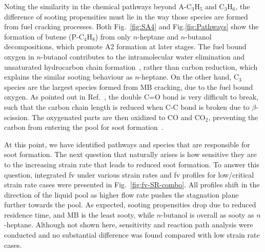 \documentclass[preprint,3p,times,twocolumn]{elsarticleUS}
\begin{document}
Noting the similarity in the chemical pathways beyond A-C$_3$H$_5$ and C$_3$H$_6$, the difference of sooting propensities must lie in the way those species are formed from fuel cracking processes. Both Fig.~\ref{fig:SA4} and Fig.\ref{fig:Pathways} show the formation of butene (P-C$_4$H$_8$) from only $n$-heptane and $n$-butanol decompositions, which promote A2 formation at later stages. The fuel bound oxygen in $n$-butanol contributes to the intramolecular water elimination and unsaturated hydrocarbon chain formation~\cite{mcenally05,mcenally11}, rather than carbon reduction, which explains the similar sooting behaviour as $n$-heptane. On the other hand, C$_3$ species are the largest species formed from MB cracking, due to the fuel bound oxygen. As pointed out in Ref.~\cite{westbrook06}, the double C=O bond is very difficult to break, such that the carbon chain length is reduced when C-C bond is broken due to $\beta$-scission. The oxygenated parts are then oxidized to CO and CO$_2$, preventing the carbon from entering the pool for soot formation~\cite{feng12,wangyl11}.
 
At this point, we have identified pathways and species that are responsible for soot formation. The next question that naturally arises is how sensitive they are to the increasing strain rate that leads to reduced soot formation. To answer this question, integrated fv under various strain rates and fv profiles for low/critical strain rate cases were presented in Fig.~\ref{fig:fv-SR-combo}. All profiles shift in the direction of the liquid pool as higher flow rate pushes the stagnation plane further towards the pool. As expected, sooting propensities drop due to reduced residence time, and MB is the least sooty, while $n$-butanol is overall as sooty as $n$-heptane. Although not shown here, sensitivity and reaction path analysis were conducted and no substantial difference was found compared with low strain rate cases. 
\end{document}
